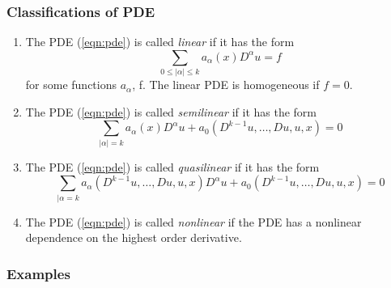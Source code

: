 \subsubsection{Classifications of PDE}
\begin{enumerate}[label=(\roman*)]
    \item The PDE (\ref{eqn:pde}) is called \textit{linear} if it has the form $$\sum_{0\le |\alpha| \le k} a_{\alpha} (x) D^{\alpha} u =f$$ 
	for some functions $a_{ \alpha }$, f. The linear PDE is homogeneous if $f=0$.
\item The PDE (\ref{eqn:pde}) is called \textit{semilinear} if it has the form
    $$\sum_{|\alpha|=k} a_{\alpha}(x) D^{\alpha}u + a_0 \left( D^{k-1}u, \ldots , Du, u, x \right) =0$$
\item The PDE (\ref{eqn:pde}) is called \textit{quasilinear} if it has the form 
    $$\sum_{|\alpha =k} a_{\alpha} (D^{k-1} u, \ldots , Du, u, x) D^{\alpha} u + a_0 \left( D^{k-1} u, \ldots , Du, u, x \right) = 0$$
\item The PDE (\ref{eqn:pde}) is called \textit{nonlinear} if the PDE has a nonlinear dependence on the highest order derivative.

\end{enumerate}

\subsubsection{Examples}


